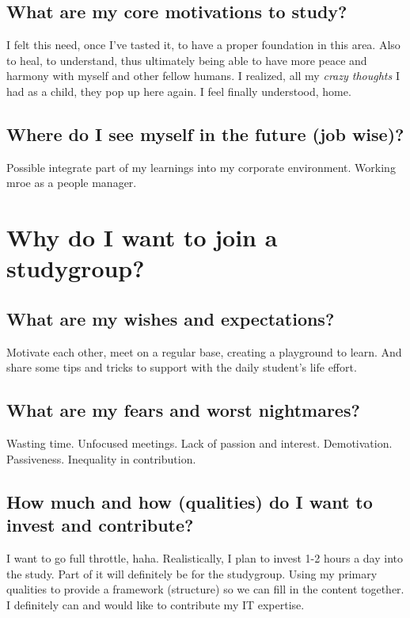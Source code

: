 \documentclass[12pt]{article}
\begin{document}
 \subsection{What are my core motivations to study?}

 I felt this need, once I've tasted it, to have a proper foundation in this area.
 Also to heal, to understand, thus ultimately being able to have more peace and harmony with myself and other fellow humans.
 I realized, all my \textit{crazy thoughts} I had as a child, they pop up here again. I feel finally understood, home.

 \subsection{Where do I see myself in the future (job wise)?}

 Possible integrate part of my learnings into my corporate environment. Working mroe as a people manager.


 \section{Why do I want to join a studygroup?}

 \subsection{What are my wishes and expectations?}

 Motivate each other, meet on a regular base, creating a playground to learn.
 And share some tips and tricks to support with the daily student's life effort.

 \subsection{What are my fears and worst nightmares?}

 Wasting time. Unfocused meetings. Lack of passion and interest. Demotivation. Passiveness. Inequality in contribution.

 \subsection{How much and how (qualities) do I want to invest and contribute?}

 I want to go full throttle, haha. Realistically, I plan to invest 1-2 hours a day into the study.
 Part of it will definitely be for the studygroup.
 Using my primary qualities to provide a framework (structure) so we can fill in the content together.
 I definitely can and would like to contribute my IT expertise.
\end{document}
